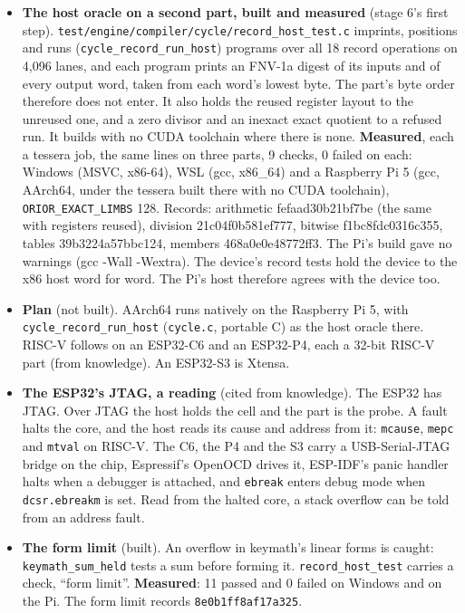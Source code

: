 \begin{enumerate}
\begin{itemize}
\begin{enumerate}
\begin{itemize}
\item \textbf{The host oracle on a second part, built and measured} (stage 6's first step). \texttt{test/\allowbreak{}engine/\allowbreak{}compiler/\allowbreak{}cycle/\allowbreak{}record\_\allowbreak{}host\_\allowbreak{}test.\allowbreak{}c} imprints, positions and runs (\texttt{cycle\_\allowbreak{}record\_\allowbreak{}run\_\allowbreak{}host}) programs over all 18 record operations on 4,096 lanes, and each program prints an FNV-1a digest of its inputs and of every output word, taken from each word's lowest byte. The part's byte order therefore does not enter. It also holds the reused register layout to the unreused one, and a zero divisor and an inexact exact quotient to a refused run. It builds with no CUDA toolchain where there is none. \textbf{Measured}, each a tessera job, the same lines on three parts, 9 checks, 0 failed on each: Windows (MSVC, x86-64), WSL (gcc, x86\_\allowbreak{}64) and a Raspberry Pi 5 (gcc, AArch64, under the tessera built there with no CUDA toolchain), \texttt{ORIOR\_\allowbreak{}EXACT\_\allowbreak{}LIMBS} 128. Records: arithmetic fefaad30b21bf7be (the same with registers reused), division 21c04f0b581ef777, bitwise f1bc8fdc0316c355, tables 39b3224a57bbc124, members 468a0e0e48772ff3. The Pi's build gave no warnings (gcc -Wall -Wextra). The device's record tests hold the device to the x86 host word for word. The Pi's host therefore agrees with the device too.
\item \textbf{Plan} (not built). AArch64 runs natively on the Raspberry Pi 5, with \texttt{cycle\_\allowbreak{}record\_\allowbreak{}run\_\allowbreak{}host} (\texttt{cycle.\allowbreak{}c}, portable C) as the host oracle there. RISC-V follows on an ESP32-C6 and an ESP32-P4, each a 32-bit RISC-V part (from knowledge). An ESP32-S3 is Xtensa.
\item \textbf{The ESP32's JTAG, a reading} (cited from knowledge). The ESP32 has JTAG. Over JTAG the host holds the cell and the part is the probe. A fault halts the core, and the host reads its cause and address from it: \texttt{mcause}, \texttt{mepc} and \texttt{mtval} on RISC-V. The C6, the P4 and the S3 carry a USB-Serial-JTAG bridge on the chip, Espressif's OpenOCD drives it, ESP-IDF's panic handler halts when a debugger is attached, and \texttt{ebreak} enters debug mode when \texttt{dcsr.\allowbreak{}ebreakm} is set. Read from the halted core, a stack overflow can be told from an address fault.
\item \textbf{The form limit} (built). An overflow in keymath's linear forms is caught: \texttt{keymath\_\allowbreak{}sum\_\allowbreak{}held} tests a sum before forming it. \texttt{record\_\allowbreak{}host\_\allowbreak{}test} carries a check, “form limit”. \textbf{Measured}: 11 passed and 0 failed on Windows and on the Pi. The form limit records \texttt{8e0b1ff8af17a325}.

\end{itemize}
\end{enumerate}
\end{itemize}
\end{enumerate}

